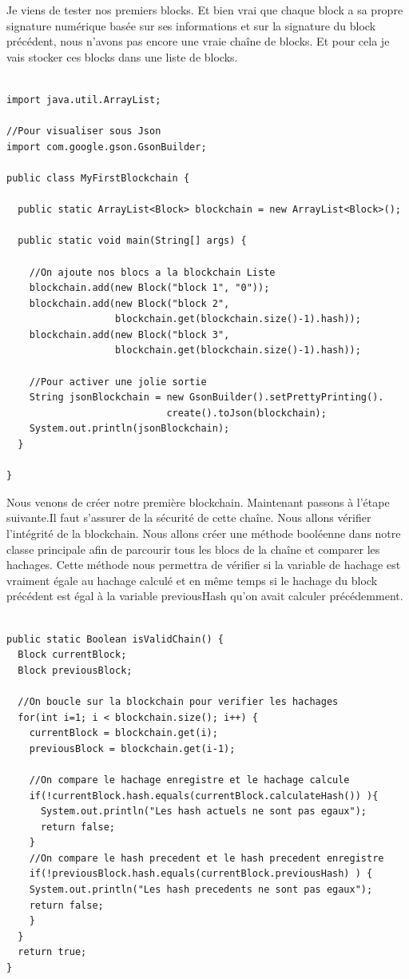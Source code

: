 \documentclass[12pt]{report}
\begin{document}
Je viens de tester nos premiers blocks. Et bien vrai que chaque block a sa propre signature numérique basée sur ses informations et sur la signature du block précédent, nous n'avons pas encore une vraie chaîne de blocks. Et pour cela je vais stocker ces blocks dans une liste de blocks.

\begin{lstlisting}

import java.util.ArrayList;

//Pour visualiser sous Json
import com.google.gson.GsonBuilder;

public class MyFirstBlockchain {

  public static ArrayList<Block> blockchain = new ArrayList<Block>(); 

  public static void main(String[] args) {	
  
    //On ajoute nos blocs a la blockchain Liste 
    blockchain.add(new Block("block 1", "0"));		
    blockchain.add(new Block("block 2", 
                   blockchain.get(blockchain.size()-1).hash)); 
    blockchain.add(new Block("block 3", 
                   blockchain.get(blockchain.size()-1).hash));
	
    //Pour activer une jolie sortie
    String jsonBlockchain = new GsonBuilder().setPrettyPrinting().
                            create().toJson(blockchain);		
    System.out.println(jsonBlockchain);
  }

}
\end{lstlisting}

Nous venons de créer notre première blockchain. Maintenant passons à l'étape suivante.Il faut s'assurer de la sécurité de cette chaîne. Nous allons  vérifier l'intégrité de la blockchain. Nous allons créer une méthode booléenne dans notre classe principale afin de parcourir tous les blocs de la chaîne et comparer les hachages. Cette méthode nous permettra de vérifier si la variable de hachage est vraiment égale au hachage calculé et en même temps si le hachage du block précédent est égal à la variable previousHash qu'on avait calculer précédemment.

\begin{lstlisting}

public static Boolean isValidChain() {
  Block currentBlock; 
  Block previousBlock;
	
  //On boucle sur la blockchain pour verifier les hachages
  for(int i=1; i < blockchain.size(); i++) {
    currentBlock = blockchain.get(i);
    previousBlock = blockchain.get(i-1);
    
    //On compare le hachage enregistre et le hachage calcule
    if(!currentBlock.hash.equals(currentBlock.calculateHash()) ){
      System.out.println("Les hash actuels ne sont pas egaux");			
      return false;
    }
    //On compare le hash precedent et le hash precedent enregistre
    if(!previousBlock.hash.equals(currentBlock.previousHash) ) {
    System.out.println("Les hash precedents ne sont pas egaux");
    return false;
    }
  }
  return true;
}

\end{lstlisting}
\end{document}
